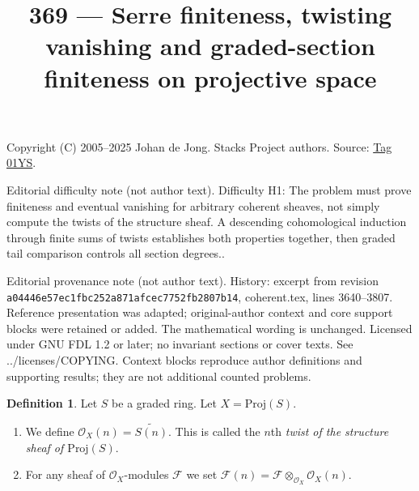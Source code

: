 \documentclass{amsart}
\theoremstyle{plain}
\theoremstyle{definition}
\newtheorem{definition}[subsection]{Definition}
\theoremstyle{remark}
\numberwithin{equation}{subsection}
\begin{document}
\title[Stacks Project, Tag 01YS]{369 --- Serre finiteness, twisting vanishing and graded-section finiteness on projective space}
\maketitle
\noindent Copyright (C) 2005--2025 Johan de Jong. Stacks Project authors. Source: \href{https://stacks.math.columbia.edu/tag/01YS}{Tag 01YS}.

\noindent Editorial difficulty note (not author text). Difficulty H1: The problem must prove finiteness and eventual vanishing for arbitrary coherent sheaves, not simply compute the twists of the structure sheaf. A descending cohomological induction through finite sums of twists establishes both properties together, then graded tail comparison controls all section degrees..

\noindent Editorial provenance note (not author text). History: excerpt from revision \texttt{a0444\allowbreak 6e57e\allowbreak c1fbc\allowbreak 252a8\allowbreak 71afc\allowbreak ec775\allowbreak 2fb28\allowbreak 07b14}, coherent.tex, lines 3640--3807. Reference presentation was adapted; original-author context and core support blocks were retained or added. The mathematical wording is unchanged. Licensed under GNU FDL 1.2 or later; no invariant sections or cover texts. See ../licenses/COPYING. Context blocks reproduce author definitions and supporting results; they are not additional counted problems.

\begin{definition}
\label{constructions-definition-twist}
Let $S$ be a graded ring. Let $X = \text{Proj}(S)$.
\begin{enumerate}
\item We define $\mathcal{O}_X(n) = \widetilde{S(n)}$.
This is called the $n$th
{\it twist of the structure sheaf of $\text{Proj}(S)$}.
\item For any sheaf of $\mathcal{O}_X$-modules $\mathcal{F}$ we set
$\mathcal{F}(n) = \mathcal{F} \otimes_{\mathcal{O}_X} \mathcal{O}_X(n)$.
\end{enumerate}
\end{definition}
\end{document}
